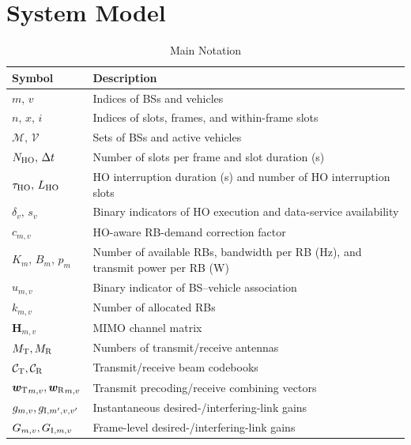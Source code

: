\documentclass[10pt,journal,letterpaper]{IEEEtran}
\newcommand{\rev}[1]{\textcolor{revisioncolor}{{}#1}}
\theoremstyle{remark}
\begin{document}
\section{System Model}{\label{sec:System Model}}

\begin{table}[t]
    \centering
    \color{revisioncolor}
    \caption{Main Notation}
    \label{tab:notation}
    \small
    \begin{tabular}{@{}>{\raggedright\arraybackslash}p{}>{\raggedright\arraybackslash}p{}@{}}
        \toprule
        \textbf{Symbol} & \textbf{Description} \\
        \midrule
        $m,\,v$ & Indices of BSs and vehicles \\
        $n,\,x,\,i$ & Indices of slots, frames, and within-frame slots \\
        $\mathcal{M},\,\mathcal{V}$ & Sets of BSs and active vehicles \\
        $N_{\rm HO},\,\Delta t$ & Number of slots per frame and slot duration (s) \\
        \rev{$\tau_{\rm HO},\,L_{\rm HO}$} & \rev{HO interruption duration (s) and number of HO interruption slots} \\
        \rev{$\delta_v,\,s_v$} & \rev{Binary indicators of HO execution and data-service availability} \\
        \rev{$c_{m,v}$} & \rev{HO-aware RB-demand correction factor} \\
        $K_m,\,B_m,\,p_m$ & Number of available RBs, bandwidth per RB (Hz), and transmit power per RB (W) \\
        $u_{m,v}$ & Binary indicator of BS--vehicle association \\
        $k_{m,v}$ & Number of allocated RBs\\
        $\boldsymbol{H}_{m,v}$ & MIMO channel matrix \\
        $M_{\rm T} , M_{\rm R}$ & Numbers of transmit/receive antennas \\
        $\mathcal{C}_{\rm T} , \mathcal{C}_{\rm R}$ & Transmit/receive beam codebooks \\
        $ {\bm{w}_{\rm T}}_{m,v} , {\bm{w}_{\rm R}}_{m,v}$ & Transmit precoding/receive combining vectors \\
        $g_{m,v} , \rev{g_{{\rm I},m',v,v'}}$ & Instantaneous desired-/interfering-link gains \\
        $G_{m,v} , G_{{\rm I},m,v}$ & Frame-level desired-/interfering-link gains \\

\end{tabular}
\end{table}
\end{document}
